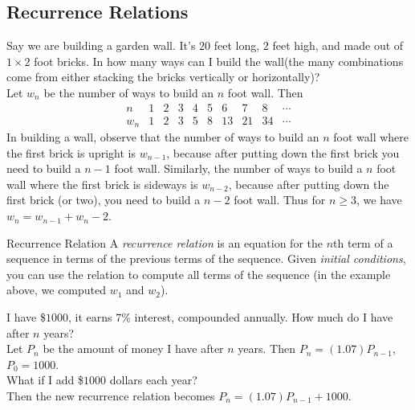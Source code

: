 \documentclass[class=article, crop=false]{standalone}
\begin{document}
  \subsection{Recurrence Relations}
  Say we are building a garden wall. It's $20$ feet long, $2$ feet high, and made out of $1\times 2$ foot bricks. In how many ways can I build the wall(the many combinations come from either stacking the bricks vertically or horizontally)? \\[10pt]
  Let $w_n$ be the number of ways to build an $n$ foot wall. Then
  \[\begin{array}{c|ccccccccc}
    n & 1 & 2 & 3 & 4 & 5 & 6 & 7 & 8 & \dotsb\\
    \hline
    w_n & 1 & 2 & 3 & 5 & 8 & 13 & 21 & 34 & \dotsb
  \end{array}\]
  In building a wall, observe that the number of ways to build an $n$ foot wall where the first brick is upright is $w_{n-1}$, because after putting down the first brick you need to build a $n-1$ foot wall. Similarly, the number of ways to build a $n$ foot wall where the first brick is sideways is $w_{n-2}$, because after putting down the first brick (or two), you need to build a $n-2$ foot wall. Thus for $n \geq 3$, we have $w_n = w_{n-1} + w_n-2$.
  \begin{definition}{Recurrence Relation}
    A \emph{recurrence relation} is an equation for the $n$th term of a sequence in terms of the previous terms of the sequence. Given \emph{initial conditions}, you can use the relation to compute all terms of the sequence (in the example above, we computed $w_1$ and $w_2$). 
  \end{definition}
  \begin{example}{}
    I have \$$1000$, it earns 7\% interest, compounded annually. How much do I have after $n$ years? \\[10pt]
    Let $P_n$ be the amount of money I have after $n$ years. Then $P_n = (1.07)P_{n-1}$, $P_0 = 1000$. \\[10pt]
    What if I add \$$1000$ dollars each year? \\[10pt]
    Then the new recurrence relation becomes $P_n = (1.07)P_{n-1} + 1000$.
  \end{example}
\end{document}
